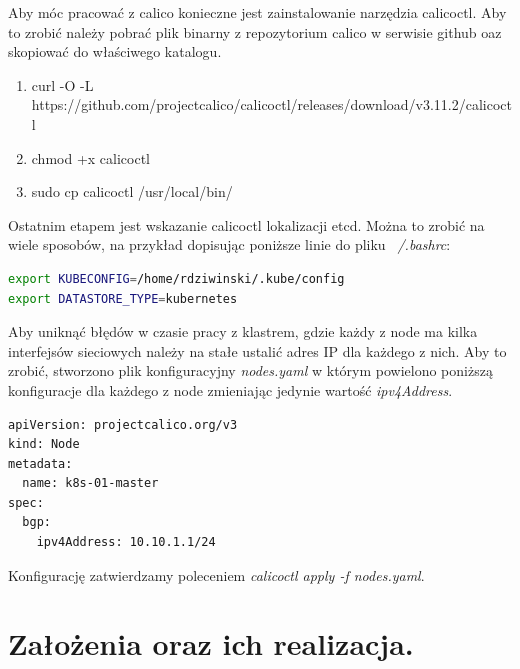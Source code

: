 \documentclass[pl,final,oneside]{mgr} %
\begin{document}
Aby móc pracować z calico konieczne jest zainstalowanie narzędzia calicoctl. Aby to zrobić należy pobrać plik binarny z repozytorium calico w serwisie github oaz skopiować do właściwego katalogu.
\begin{enumerate}
	\item curl -O -L  https://github.com/projectcalico/calicoctl/releases/download/v3.11.2/calicoctl
	\item chmod +x calicoctl
	\item sudo cp calicoctl /usr/local/bin/
\end{enumerate}
Ostatnim etapem jest wskazanie calicoctl lokalizacji etcd. Można to zrobić na wiele sposobów, na przykład dopisując poniższe linie do pliku \textit{ ~/.bashrc}:
\begin{lstlisting}[language=Bash]
export KUBECONFIG=/home/rdziwinski/.kube/config
export DATASTORE_TYPE=kubernetes
\end{lstlisting}

Aby uniknąć błędów w czasie pracy z klastrem, gdzie każdy z node ma kilka interfejsów sieciowych należy na stałe ustalić adres IP dla każdego z nich. Aby to zrobić, stworzono plik konfiguracyjny \textit{nodes.yaml} w którym powielono poniższą konfiguracje dla każdego z node zmieniając jedynie wartość \textit{ipv4Address}.
\begin{lstlisting}[language=Bash]
apiVersion: projectcalico.org/v3
kind: Node
metadata:
  name: k8s-01-master
spec:
  bgp:
    ipv4Address: 10.10.1.1/24
\end{lstlisting}
Konfigurację zatwierdzamy poleceniem \textit{calicoctl apply -f nodes.yaml}.



\chapter{Założenia oraz ich realizacja.}
\end{document}
